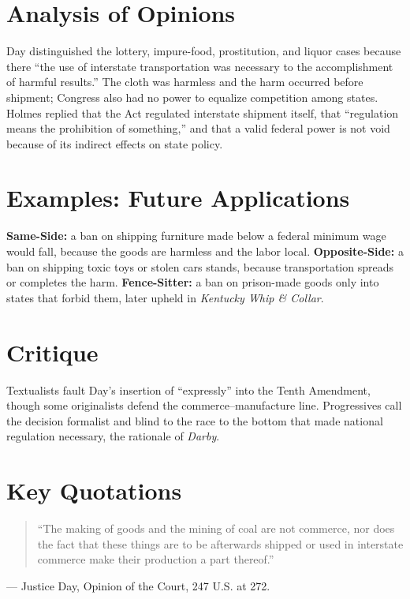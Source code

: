 \documentclass[12pt]{article}
\begin{document}
\section{Analysis of Opinions}
Day distinguished the lottery, impure-food, prostitution, and liquor cases because there ``the use of interstate transportation was necessary to the accomplishment of harmful results.'' The cloth was harmless and the harm occurred before shipment; Congress also had no power to equalize competition among states. Holmes replied that the Act regulated interstate shipment itself, that ``regulation means the prohibition of something,'' and that a valid federal power is not void because of its indirect effects on state policy.

\section{Examples: Future Applications}
\textbf{Same-Side:} a ban on shipping furniture made below a federal minimum wage would fall, because the goods are harmless and the labor local. \textbf{Opposite-Side:} a ban on shipping toxic toys or stolen cars stands, because transportation spreads or completes the harm. \textbf{Fence-Sitter:} a ban on prison-made goods only into states that forbid them, later upheld in \textit{Kentucky Whip \& Collar}.

\section{Critique}
Textualists fault Day's insertion of ``expressly'' into the Tenth Amendment, though some originalists defend the commerce--manufacture line. Progressives call the decision formalist and blind to the race to the bottom that made national regulation necessary, the rationale of \textit{Darby}.

\section{Key Quotations}
\begin{quote}
``The making of goods and the mining of coal are not commerce, nor does the fact that these things are to be afterwards shipped or used in interstate commerce make their production a part thereof.''
\end{quote}
\noindent --- Justice Day, Opinion of the Court, 247 U.S. at 272.
\end{document}
